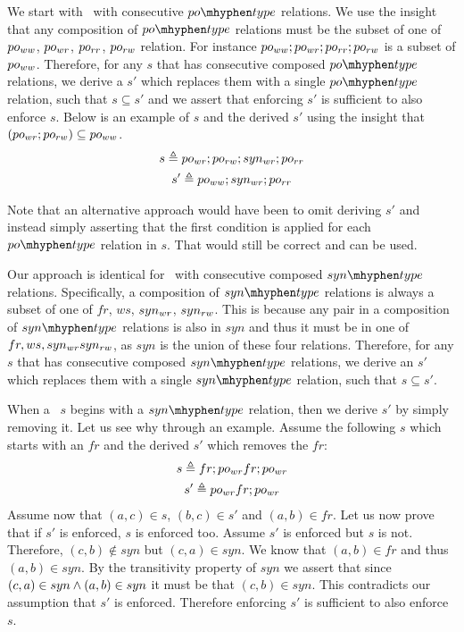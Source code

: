 We start with \synpats\ with consecutive $\potype$ relations.
We use the insight that any composition of $\potype$ relations must be the subset of one of $po_{ww}$, $po_{wr}$, $po_{rr}$, $po_{rw}$ relation. 
For instance $po_{ww};po_{wr};po_{rr};po_{rw}$ is a subset of $po_{ww}$. Therefore, for any $s$ that has consecutive composed $\potype$ relations, we derive a $s'$ which replaces them with a single $\potype$ relation, such that $s \subseteq s'$ and we assert that enforcing $s'$ is sufficient to also enforce $s$. Below is an example of $s$ and the derived $s'$ using the insight that 
$(po_{wr} ; po_{rw}) \subseteq po_{ww}$.
\begin{gather*}
    s \triangleq po_{wr} ; po_{rw}; syn_{wr}; po_{rr} \\
    s' \triangleq po_{ww}; syn_{wr}; po_{rr}
\end{gather*}



Note that an alternative approach would have been to omit deriving $s'$ and instead simply asserting that the first condition is applied for each $\potype$ relation in $s$. That would still be correct and can be used.

Our approach is identical for \synpats\ with consecutive composed $\syntype$ relations. Specifically, a composition of $\syntype$ relations is always a subset of one of $fr$, $ws$, $syn_{wr}$, $syn_{rw}$. This is because 
any pair in a composition of $\syntype$ relations is also in $syn$ and thus it must be in one of $fr, ws, syn_{wr} syn_{rw}$, as $syn$ is the union of these four relations.
Therefore, for any $s$ that has consecutive composed $\syntype$ relations, we derive an $s'$ which replaces them with a single $\syntype$ relation, such that $s \subseteq s'$.

When a \synpat\ $s$ begins with a $\syntype$ relation, then we derive $s'$ by simply removing it.
Let us see why through an example.
Assume the following $s$ which starts with an $fr$ and the derived $s'$ which removes the $fr$:
\begin{gather*}
    s\triangleq fr ; po_{wr} fr; po_{wr} \\
    s' \triangleq po_{wr} fr; po_{wr}
\end{gather*}
Assume now that $(a,c) \in s$,  $(b,c) \in s'$ and $(a, b) \in fr$.
Let us now prove that if $s'$ is enforced, $s$ is enforced too.
Assume $s'$ is enforced but $s$ is not. Therefore, $(c,b) \notin syn$ but $(c, a) \in syn$. We know that $(a, b) \in fr$ and thus $(a, b) \in syn$. By the transitivity property of $syn$ we assert that since $(c, a) \in syn \wedge (a, b) \in syn$ it must be that $(c, b) \in syn$. This contradicts our assumption that $s'$ is enforced.
Therefore enforcing $s'$ is sufficient to also enforce $s$.

